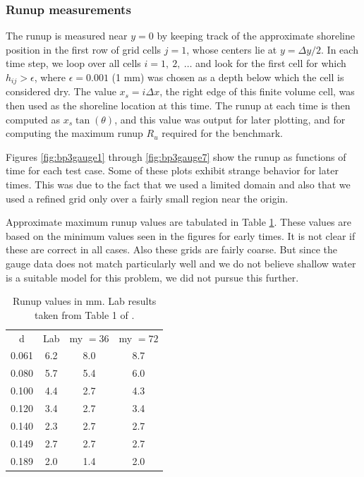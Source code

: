 \subsubsection{Runup measurements}

The runup is measured near $y=0$ by keeping track of the approximate shoreline
position in the first row of grid cells $j=1$, whose centers lie at
$y=\Delta y / 2$.  In each time step, we loop over all cells
$i=1,~2,~\ldots$ and look for the first cell for which $h_{ij} > \epsilon$,
where $\epsilon = 0.001$ (1 mm) was chosen as a depth below which the cell
is considered dry.  
The value $x_s = i\Delta x$, the right edge of this finite volume cell, was
then used as the shoreline location at this time.  The runup at each time
is then computed as $x_s\tan(\theta)$, and this value was output for
later plotting, and for computing the maximum runup $R_u$ required for the
benchmark.

Figures \ref{fig:bp3gauge1} through \ref{fig:bp3gauge7} show the 
runup as functions of time for each test case.  
Some of these plots exhibit strange
behavior for later times.  This was due to the fact that we used a limited
domain and also that we used a refined grid only over a fairly small region
near the origin.  

Approximate maximum runup values are
tabulated in Table \ref{fig:bp3runup}.  These values are based on the 
minimum values seen in the figures for early times.  It is not clear if
these are correct in all cases.  Also these grids are fairly coarse.  But
since the gauge data does not match particularly well and we do not believe
shallow water is a suitable model for this problem, we did not pursue this
further.

\begin{table}[ht]
\hfil\begin{tabular}{c|c|c|c}
d & Lab & my $= 36$ & my $= 72$ \\
0.061&6.2&8.0 &8.7 \\
0.080&5.7&5.4 &6.0 \\
0.100&4.4&2.7 &4.3 \\
0.120&3.4&2.7 &3.4 \\
0.140&2.3&2.7 &2.7 \\
0.149&2.7&2.7 &2.7 \\
0.189&2.0&1.4 &2.0
\end{tabular}\hfil
\caption{\label{fig:bp3runup} 
Runup values in mm.  Lab results taken from Table 1 of
\cite{bp-description}.
  }
\end{table}



